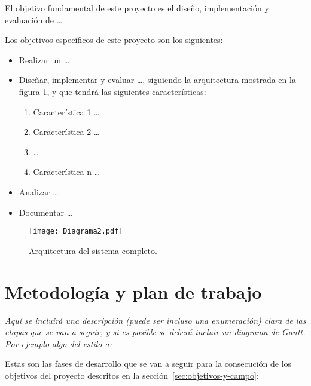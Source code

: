 \documentclass[11pt,a4paper,oneside]{article}
\begin{document}
El objetivo fundamental de este proyecto es el diseño, implementación y
evaluación de \ldots

Los objetivos específicos de este proyecto son los siguientes:

\begin{itemize}
\item Realizar un  \ldots
\item Diseñar, implementar y evaluar  \ldots, siguiendo la arquitectura
  mostrada en la figura \ref{fig_arquitectura}, y que tendrá las
  siguientes características:

  \begin{enumerate}
  \item Característica 1 \ldots
  \item Característica 2 \ldots
  \item  \ldots
  \item Característica n \ldots
  \end{enumerate}

\item Analizar  \ldots

\item Documentar  \ldots

\end{itemize}

  \begin{figure}[tphb]
    \centering
    \texttt{[image: Diagrama2.pdf]}
    \caption{Arquitectura del sistema completo.}
    \label{fig_arquitectura}
  \end{figure}


\section{Metodología y plan de trabajo}
\label{sec:metodologia-y-plan}

\textit{Aquí se incluirá una descripción (puede ser incluso una enumeración)
clara de las etapas que se van a seguir, y si es posible se deberá
incluir un diagrama de Gantt. Por ejemplo algo del estilo a:}

Estas son las fases de desarrollo que se van a seguir para la
consecución de los objetivos del proyecto descritos en la sección~\ref{sec:objetivos-y-campo}:
\end{document}
